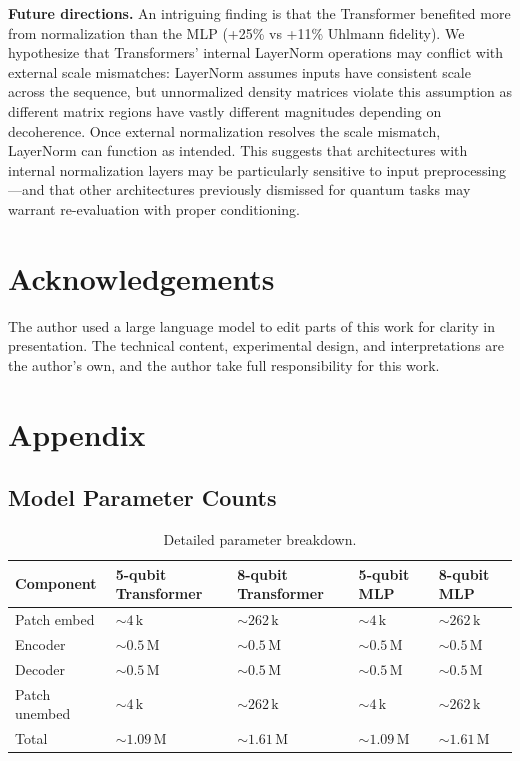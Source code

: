 \documentclass[11pt]{article}
\begin{document}
\textbf{Future directions.} An intriguing finding is that the Transformer benefited more from normalization than the MLP (+25\% vs +11\% Uhlmann fidelity). We hypothesize that Transformers' internal LayerNorm operations may conflict with external scale mismatches: LayerNorm assumes inputs have consistent scale across the sequence, but unnormalized density matrices violate this assumption as different matrix regions have vastly different magnitudes depending on decoherence. Once external normalization resolves the scale mismatch, LayerNorm can function as intended. This suggests that architectures with internal normalization layers may be particularly sensitive to input preprocessing---and that other architectures previously dismissed for quantum tasks may warrant re-evaluation with proper conditioning.
\section{Acknowledgements}
\label{sec:org94ceb2d}
The author used a large language model to edit parts of this work for clarity in presentation. The technical content, experimental design, and interpretations are the author's own, and the author take full responsibility for this work.
\section{Appendix}
\label{sec:org9f78bf5}

\subsection{Model Parameter Counts}
\label{sec:orgde14113}
\begin{table}[htbp]
\caption{\label{tab:orgfec944a}Detailed parameter breakdown.}
\centering
\begin{tabular}{lllll}
Component & 5-qubit Transformer & 8-qubit Transformer & 5-qubit MLP & 8-qubit MLP\\
\hline
Patch embed & \(\sim 4\,\mathrm{k}\) & \(\sim 262\,\mathrm{k}\) & \(\sim 4\,\mathrm{k}\) & \(\sim 262\,\mathrm{k}\)\\
Encoder & \(\sim 0.5\,\mathrm{M}\) & \(\sim 0.5\,\mathrm{M}\) & \(\sim 0.5\,\mathrm{M}\) & \(\sim 0.5\,\mathrm{M}\)\\
Decoder & \(\sim 0.5\,\mathrm{M}\) & \(\sim 0.5\,\mathrm{M}\) & \(\sim 0.5\,\mathrm{M}\) & \(\sim 0.5\,\mathrm{M}\)\\
Patch unembed & \(\sim 4\,\mathrm{k}\) & \(\sim 262\,\mathrm{k}\) & \(\sim 4\,\mathrm{k}\) & \(\sim 262\,\mathrm{k}\)\\
Total & \(\sim 1.09\,\mathrm{M}\) & \(\sim 1.61\,\mathrm{M}\) & \(\sim 1.09\,\mathrm{M}\) & \(\sim 1.61\,\mathrm{M}\)\\
\end{tabular}
\end{table}
\end{document}
